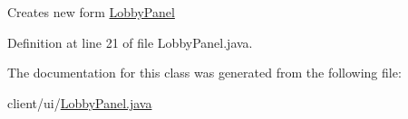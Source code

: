 Creates new form \hyperlink{classclient_1_1ui_1_1_lobby_panel}{Lobby\+Panel} 

Definition at line 21 of file Lobby\+Panel.\+java.



The documentation for this class was generated from the following file\+:\begin{DoxyCompactItemize}
\item 
client/ui/\hyperlink{_lobby_panel_8java}{Lobby\+Panel.\+java}\end{DoxyCompactItemize}
